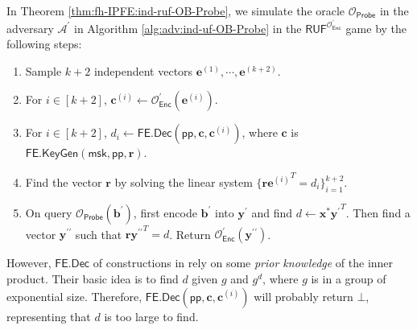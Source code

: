 In Theorem \ref{thm:fh-IPFE:ind-ruf-OB-Probe}, we simulate the oracle $\mathcal{O}_{\textsf{Probe}}$ in the adversary $\mathcal{A}^\prime$ in Algorithm \ref{alg:adv:ind-uf-OB-Probe} in the $\textsf{RUF}^{ \mathcal{O}^\prime_{\textsf{Enc}} }$ game by the following steps:

\begin{enumerate}

\item Sample $k+2$ independent vectors $\mathbf{e}^{(1)}, \cdots, \mathbf{e}^{(k+2)}$.

\item For $i \in [k+2]$, $\mathbf{c}^{(i)} \gets \mathcal{O}^\prime_{\textsf{Enc}}(\mathbf{e}^{(i)})$.

\item For $i \in [k+2]$,  $d_i \gets \textsf{FE.Dec}(\textsf{pp}, \mathbf{c}, \mathbf{c}^{(i)})$, where $\mathbf{c}$ is $\textsf{FE.KeyGen}(\textsf{msk}, \textsf{pp}, \mathbf{r})$.

\item Find the vector $\mathbf{r}$ by solving the linear system $\{ \mathbf{r} {\mathbf{e}^{(i)}}^T = d_i \}_{i=1}^{k+2}$.

\item On query $\mathcal{O}_{\textsf{Probe}}(\mathbf{b}^\prime)$, first encode $\mathbf{b}^\prime$ into $\mathbf{y}^\prime$ and find $d \gets \mathbf{x}^{*}{\mathbf{y}^\prime}^T$. Then find a vector $\mathbf{y}^{\prime\prime}$ such that $\mathbf{r} {\mathbf{y}^{\prime\prime}}^T = d$. Return $\mathcal{O}^\prime_{\textsf{Enc}}(\mathbf{y}^{\prime\prime})$.

\end{enumerate}

However, $\textsf{FE.Dec}$ of constructions in \cite{cryptoeprint:2015/1255, 10.1007/978-3-319-45871-7_24, cryptoeprint:2016/440} rely on some \emph{prior knowledge} of the inner product. Their basic idea is to find $d$ given $g$ and $g^d$, where $g$ is in a group of exponential size. Therefore, $\textsf{FE.Dec}(\textsf{pp}, \mathbf{c}, \mathbf{c}^{(i)})$ will probably return $\bot$, representing that $d$ is too large to find.

